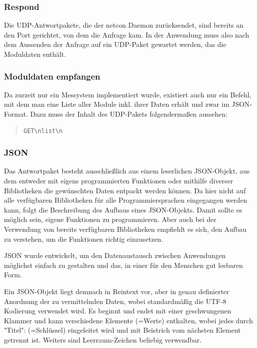\documentclass[a4paper,14pt,headsepline]{scrartcl}
\begin{document}
\newpage

\subsubsection*{Respond}
Die UDP-Antwortpakete, die der netcon Daemon zurücksendet, sind bereits an den Port gerichtet, von dem die Anfrage kam. In der Anwendung muss also nach dem Aussenden der Anfrage auf ein UDP-Paket gewartet werden, das die Moduldaten enthält.

\subsubsection*{Moduldaten empfangen}

Da zurzeit nur ein Messystem implementiert wurde, existiert auch nur ein Befehl, mit dem man eine Liste aller Module inkl. ihrer Daten erhält und zwar im JSON-Format. Dazu muss der Inhalt des UDP-Pakets folgendermaßen aussehen:

\begin{quote}
\begin{verbatim}
GET\nlist\n
\end{verbatim}
\end{quote} 

\subsubsection*{JSON}

Das Antwortpaket besteht ausschließlich aus einem leserlichen JSON-Objekt, aus dem entweder mit eigens programmierten Funktionen oder mithilfe diverser Bibliotheken die gewünschten Daten entpackt werden können. Da hier nicht auf alle verfügbaren Bibliotheken für alle Programmiersprachen eingegangen werden kann, folgt die Beschreibung des Aufbaus eines JSON-Objekts. Damit sollte es möglich sein, eigene Funktionen zu programmieren. Aber auch bei der Verwendung von bereits verfügbaren Bibliotheken empfiehlt es sich, den Aufbau zu verstehen, um die Funktionen richtig einzusetzen. 

\newpage

JSON wurde entwickelt, um den Datenaustausch zwischen Anwendungen \linebreak möglichst einfach zu gestalten und das, in einer für den Menschen gut lesbaren Form. 

Ein JSON-Objekt liegt demnach in Reintext vor, aber in genau definierter Anordnung der zu vermittelnden Daten, wobei standardmäßig die UTF-8 Kodierung verwendet wird. Es beginnt und endet mit einer geschwungenen Klammer und kann verschiedene Elemente (=Werte) enthalten, wobei jedes durch "Titel": (=Schlüssel) eingeleitet wird und mit Beistrich vom nächsten Element getrennt ist. Weiters sind Leerraum-Zeichen beliebig verwendbar.
\end{document}
